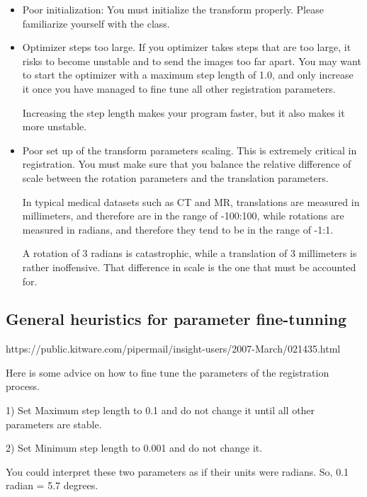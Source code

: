 \begin{itemize}
\item Poor initialization:    You must initialize the transform properly.
Please familiarize yourself with the  class.
\item Optimizer steps too large. If you optimizer takes steps that are too
large, it risks to become unstable and to send the images too far apart.  You
may want to start the optimizer with a maximum step length of 1.0, and only
increase it once you have managed to fine tune all other registration
parameters.

Increasing the step length makes your program faster, but it also makes it more
unstable.



\item Poor set up of the transform parameters scaling.  This is extremely
critical in registration. You must make sure that you balance the relative
difference of scale between the rotation parameters and the translation
parameters.

In typical medical datasets such as CT and MR, translations are measured in
millimeters, and therefore are in the range of -100:100, while rotations are
measured in radians, and therefore they tend to be in the range of   -1:1.


A rotation of 3 radians is catastrophic, while a translation of 3 millimeters
is rather inoffensive.  That difference in scale is the one that must be
accounted for.
\end{itemize}



\subsection{General heuristics for parameter fine-tunning}





https://public.kitware.com/pipermail/insight-users/2007-March/021435.html

Here is some advice on how to fine tune the parameters
of the registration process.


1) Set Maximum step length to 0.1 and do not change it
   until all other parameters are stable.

2) Set Minimum step length to 0.001 and do not change it.

   You could interpret these two parameters as if their
   units were radians. So, 0.1 radian = 5.7 degrees.


